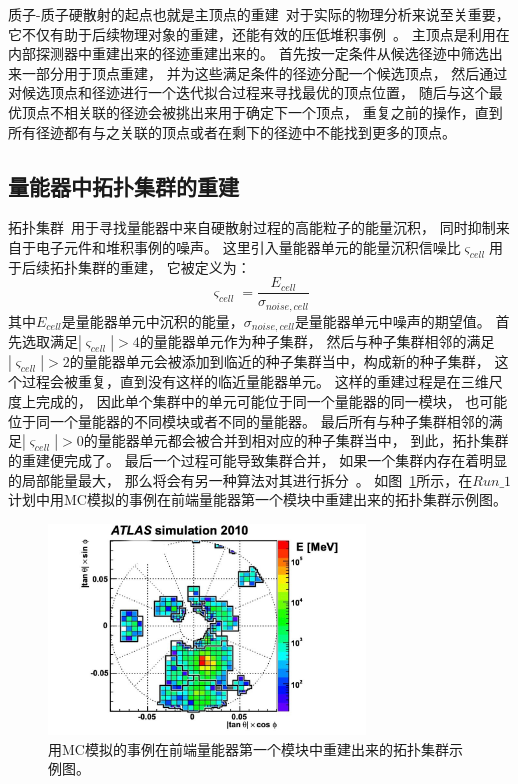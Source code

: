 质子-质子硬散射的起点也就是主顶点的重建~\cite{VERTEX1,VERTEX2}对于实际的物理分析来说至关重要，
它不仅有助于后续物理对象的重建，还能有效的压低堆积事例~\cite{PileUp}。
主顶点是利用在内部探测器中重建出来的径迹重建出来的。
首先按一定条件从候选径迹中筛选出来一部分用于顶点重建，
并为这些满足条件的径迹分配一个候选顶点，
然后通过对候选顶点和径迹进行一个迭代拟合过程来寻找最优的顶点位置，
随后与这个最优顶点不相关联的径迹会被挑出来用于确定下一个顶点，
重复之前的操作，直到所有径迹都有与之关联的顶点或者在剩下的径迹中不能找到更多的顶点。

\subsection{量能器中拓扑集群的重建}
\label{sec:TOPTCLUS}


拓扑集群~\cite{TOPOCLUSTER}用于寻找量能器中来自硬散射过程的高能粒子的能量沉积，
同时抑制来自于电子元件和堆积事例的噪声。
这里引入量能器单元的能量沉积信噪比$\varsigma_{cell}$用于后续拓扑集群的重建，
它被定义为：
\begin{equation} 
\label{eq:TOPOSN}
\varsigma_{cell}=\frac{E_{cell}}{\sigma_{noise,cell}}
\end{equation}
其中$E_{cell}$是量能器单元中沉积的能量，$\sigma_{noise,cell}$是量能器单元中噪声的期望值。
首先选取满足$|\varsigma_{cell}|>4$的量能器单元作为种子集群，
然后与种子集群相邻的满足$|\varsigma_{cell}|>2$的量能器单元会被添加到临近的种子集群当中，构成新的种子集群，
这个过程会被重复，直到没有这样的临近量能器单元。
这样的重建过程是在三维尺度上完成的，
因此单个集群中的单元可能位于同一个量能器的同一模块，
也可能位于同一个量能器的不同模块或者不同的量能器。
最后所有与种子集群相邻的满足$|\varsigma_{cell}|>0$的量能器单元都会被合并到相对应的种子集群当中，
到此，拓扑集群的重建便完成了。
最后一个过程可能导致集群合并，
如果一个集群内存在着明显的局部能量最大，
那么将会有另一种算法对其进行拆分~\cite{TOPOCLUSTER}。
如图~\ref{fig:ATLASORT2}所示，在$Run\_1$计划中用MC模拟的事例在前端量能器第一个模块中重建出来的拓扑集群示例图。

\begin{figure}
  \begin{center}
    \includegraphics[width=0.75\textwidth]{figuresEXP/ATLASORT2.jpg}
  \end{center}
  \caption{
用MC模拟的事例在前端量能器第一个模块中重建出来的拓扑集群示例图。
  }
    \label{fig:ATLASORT2}
\end{figure}




